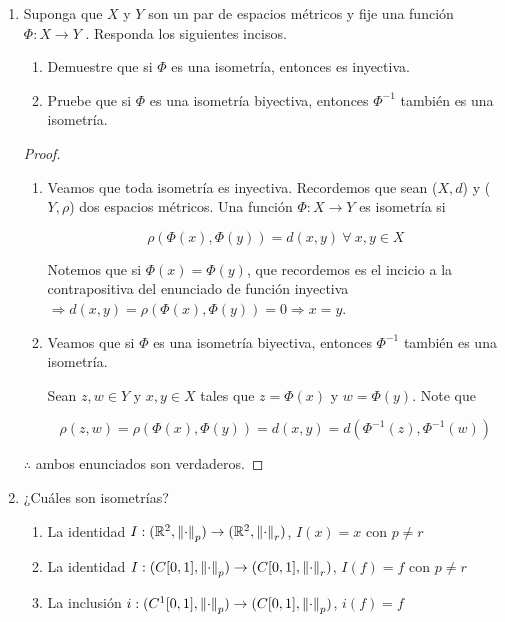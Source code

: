 \documentclass[12pt]{article}
\begin{document}
\begin{enumerate}[label=\textbf{\arabic*}.]
\begin{proof}
\begin{enumerate}
        $$f^{\prime}(x)=\frac{1}{1+x^2} \leqslant 1$$

        Esto demuestra que $|\arctan a-\arctan b|\leq |a-b|$, por lo que la contante de Lipschitz es 1.
    \end{enumerate}
    $\therefore$ se han demostrado los tres incisos. 
\end{proof}

\item Suponga que $X$ y $Y$ son un par de espacios métricos y fije una función $\Phi : X \to Y$ . Responda los siguientes incisos.
\begin{enumerate}
    \item Demuestre que si $\Phi$ es una isometría, entonces es inyectiva.
    \item Pruebe que si $\Phi$ es una isometría biyectiva, entonces $\Phi^{-1}$ también es una isometría.
\end{enumerate}

\begin{proof}
    \begin{enumerate}
        \item Veamos que toda isometría es inyectiva. Recordemos que sean ($X,d$) y ($Y,\rho$) dos espacios métricos. Una función $\Phi : X \to Y$ es isometría si

        $$\rho(\Phi(x),\Phi(y)) = d(x,y) \: \forall \: x,y \in X$$

        Notemos que si $\Phi(x) = \Phi(y)$, que recordemos es el incicio a la contrapositiva del enunciado de función inyectiva $\Rightarrow d(x,y) = \rho(\Phi(x),\Phi(y)) = 0 \Rightarrow x = y$.

        \item Veamos que si $\Phi$ es una isometría biyectiva, entonces $\Phi^{-1}$ también es una isometría.

        Sean $z,w \in Y$ y $x,y \in X$ tales que $z = \Phi(x)$ y $w = \Phi(y)$. Note que 

        $$\rho(z,w) = \rho(\Phi(x),\Phi(y)) = d(x,y) = d(\Phi^{-1}(z),\Phi^{-1}(w))$$
    \end{enumerate}
    $\therefore$ ambos enunciados son verdaderos. 
\end{proof}

\item ¿Cuáles son isometrías?
\begin{enumerate}
    \item La identidad \( I : (\mathbb{R}^2, \norm{\cdot}_p) \rightarrow (\mathbb{R}^2, \norm{\cdot}_r) \), \( I(x) = x \) con \( p \neq r \) 
    \item  La identidad \( I : (C[0, 1], \norm{\cdot}_p) \rightarrow (C[0, 1], \norm{\cdot}_r) \), \( I(f) = f \) con \( p \neq r \) 
    \item La inclusión \( i : (C^1[0, 1], \norm{\cdot}_p) \rightarrow (C[0, 1], \norm{\cdot}_p) \), \( i(f) = f \) 
\end{enumerate}


\end{enumerate}
\end{document}
